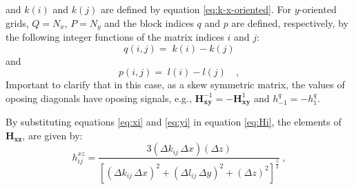 and $k(i)$ and $k(j)$ are defined by equation \ref{eq:k-x-oriented}.
For $y$-oriented grids, $Q = N_{x}$, $P = N_{y}$ and the block indices
$q$ and $p$ are defined, respectively, by the following integer functions 
of the matrix indices $i$ and $j$:
\begin{equation}
q(i, j) = \;  k(i) - k(j)  
\label{eq:Hxy-q-y-oriented}
\end{equation}
and
\begin{equation}
p(i, j) = \;  l(i) - l(j)  \quad ,
\label{eq:Hxy-p-y-oriented}
\end{equation}
Important to clarify that in this case, as a skew symmetric matrix, the values of oposing diagonals have oposing signals, e.g., $\mathbf{H}^{-1}_\mathbf{xy} = -\mathbf{H}^{1}_\mathbf{xy}$ and $h^{q}_{-1} = -h^{q}_{1} $.


By substituting equations \ref{eq:xi} and \ref{eq:yi} in equation \ref{eq:Hi}, the elements of $\mathbf{H_{xz}}$, are given by:
\begin{equation}
h^{xz}_{ij} = \frac{3 (\Delta k_{ij} \, \Delta x)(\Delta z)}{\left[ 
	\left( \Delta k_{ij} \, \Delta x \right)^{2} + 
	\left( \Delta l_{ij} \, \Delta y \right)^{2} + 
	\left( \Delta z \right)^{2} \right]^{\frac{5}{2}}} \: ,
\label{eq:hxz_mag}
\end{equation}


